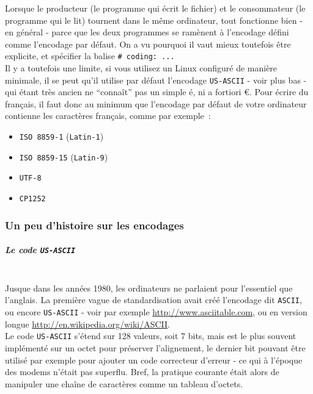     Lorsque le producteur (le programme qui écrit le fichier) et le
consommateur (le programme qui le lit) tournent dans le même ordinateur,
tout fonctionne bien - en général - parce que les deux programmes se
ramènent à l'encodage défini comme l'encodage par défaut. On a vu
pourquoi il vaut mieux toutefois être explicite, et spécifier la balise
\texttt{\#\ coding:\ ...}\\

Il y a toutefois une limite, si vous utilisez un Linux configuré de
manière minimale, il se peut qu'il utilise par défaut l'encodage
\texttt{US-ASCII} - voir plus bas - qui étant très ancien ne ``connaît''
pas un simple é, ni a fortiori €. Pour écrire du français, il faut donc
au minimum que l'encodage par défaut de votre ordinateur contienne les
caractères français, comme par exemple~:
\begin{itemize}
	\item
	\texttt{ISO\ 8859-1} (\texttt{Latin-1})
	\item
	\texttt{ISO\ 8859-15} (\texttt{Latin-9})
	\item
	\texttt{UTF-8}
	\item
	\texttt{CP1252}
\end{itemize}

    \hypertarget{un-peu-dhistoire-sur-les-encodages}{%
\subsubsection{Un peu d'histoire sur les
encodages}\label{un-peu-dhistoire-sur-les-encodages}}

    \hypertarget{le-code-us-ascii}{%
\subparagraph{\texorpdfstring{Le code
\texttt{US-ASCII}}{Le code US-ASCII}\\\\}\label{le-code-us-ascii}}

    Jusque dans les années 1980, les ordinateurs ne parlaient pour
l'essentiel que l'anglais. La première vague de standardisation avait
créé l'encodage dit \texttt{ASCII}, ou encore \texttt{US-ASCII} - voir
par exemple \href{http://www.asciitable.com}{http://www.asciitable.com}, ou en version longue
\href{http://en.wikipedia.org/wiki/ASCII}{http://en.wikipedia.org/wiki/ASCII}.\\

Le code \texttt{US-ASCII} s'étend sur 128 valeurs, soit 7 bits, mais est
le plus souvent implémenté sur un octet pour préserver l'alignement, le
dernier bit pouvant être utilisé par exemple pour ajouter un code
correcteur d'erreur - ce qui à l'époque des modems n'était pas superflu.
Bref, la pratique courante était alors de manipuler une chaîne de
caractères comme un tableau d'octets.

